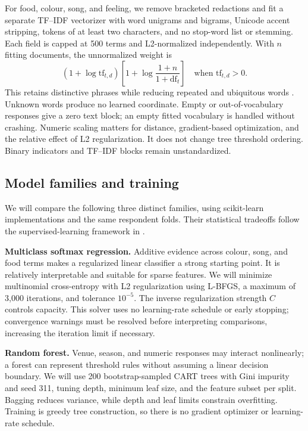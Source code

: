 \documentclass[12pt]{article}
\begin{document}
For food, colour, song, and feeling, we remove bracketed redactions and fit a
separate TF--IDF vectorizer with word unigrams and bigrams, Unicode accent stripping,
tokens of at least two characters, and no stop-word list or stemming. Each field
is capped at 500 terms and L2-normalized independently. With $n$ fitting documents,
the unnormalized weight is
\[
 (1+\log \mathrm{tf}_{t,d})
 \left[1+\log\frac{1+n}{1+\mathrm{df}_t}\right]
 \quad\text{when }\mathrm{tf}_{t,d}>0.
\]
This retains distinctive phrases while reducing repeated and ubiquitous words
\cite{sklearntext}. Unknown words produce no learned coordinate. Empty or
out-of-vocabulary responses give a zero text block; an empty fitted vocabulary is
handled without crashing. Numeric scaling matters for distance, gradient-based
optimization, and the relative effect of L2 regularization. It does not change
tree threshold ordering. Binary indicators and TF--IDF blocks remain unstandardized.

\clearpage
\subsection*{Model families and training}
We will compare the following three distinct families, using scikit-learn
implementations and the same respondent folds. Their statistical tradeoffs follow
the supervised-learning framework in \cite{hastie2009esl}.

\textbf{Multiclass softmax regression.}
Additive evidence across colour, song, and food terms makes a regularized linear
classifier a strong starting point. It is relatively interpretable and suitable
for sparse features. We will minimize multinomial cross-entropy with L2
regularization using L-BFGS, a maximum of 3,000 iterations, and tolerance $10^{-5}$.
The inverse regularization strength $C$ controls capacity. This solver uses no
learning-rate schedule or early stopping; convergence warnings must be resolved
before interpreting comparisons, increasing the iteration limit if necessary.

\textbf{Random forest.}
Venue, season, and numeric responses may interact nonlinearly; a forest can
represent threshold rules without assuming a linear decision boundary. We will
use 200 bootstrap-sampled CART trees with Gini impurity and seed 311, tuning depth,
minimum leaf size, and the feature subset per split. Bagging reduces variance,
while depth and leaf limits constrain overfitting. Training is greedy tree
construction, so there is no gradient optimizer or learning-rate schedule.
\end{document}
